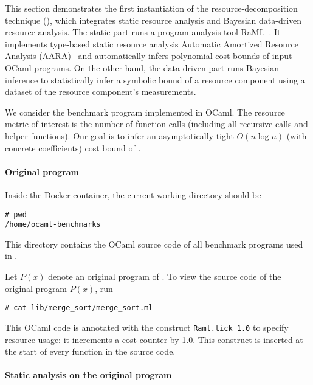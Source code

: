 This section demonstrates the first instantiation of the resource-decomposition
technique (), which integrates static
resource analysis and Bayesian data-driven resource analysis.
%
The static part runs a program-analysis tool RaML~\citep{RaML}.
%
It implements type-based static resource analysis Automatic Amortized Resource
Analysis (AARA)~\citep{Hoffmann2011a,Hoffmann2017} and automatically infers
polynomial cost bounds of input OCaml programs.
%
On the other hand, the data-driven part runs Bayesian inference to statistically
infer a symbolic bound of a resource component using a dataset of the resource
component's measurements.

We consider the benchmark program \mergesort{} implemented in OCaml.
%
The resource metric of interest is the number of function calls (including all
recursive calls and helper functions).
%
Our goal is to infer an asymptotically tight $O (n \log n)$ (with concrete
coefficients) cost bound of \mergesort{}.

\paragraph{Original program}

Inside the Docker container, the current working directory should be
\begin{verbatim}
# pwd
/home/ocaml-benchmarks
\end{verbatim}
%
This directory contains the OCaml source code of all benchmark programs used in
.

Let $P(x)$ denote an original program of \mergesort{}.
%
To view the source code of the original program $P(x)$, run
\begin{verbatim}
# cat lib/merge_sort/merge_sort.ml
\end{verbatim}
%
This OCaml code is annotated with the construct \texttt{Raml.tick 1.0} to
specify resource usage: it increments a cost counter by 1.0.
%
This construct is inserted at the start of every function in the source code.

\paragraph{Static analysis on the original program}

